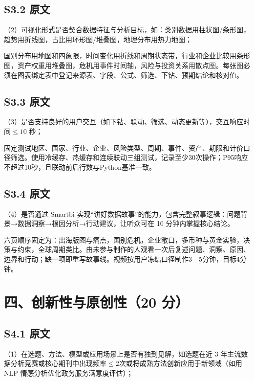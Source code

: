 \subsection*{S3.2 原文}
（2）可视化形式是否契合数据特征与分析目标，如：类别数据用柱状图/条形图，趋势用折线图，占比用环形图/堆叠图，地理分布用热力地图；

\begin{decisionbox}[S3.2 怎么做]
国别分布用地图和四象限，时间变化用折线和周期状态带，行业和企业比较用条形图，资产权重用堆叠图，危机用事件时间轴，风险与投资关系用散点图。每张图必须在图表绑定表中登记来源表、字段、公式、筛选、下钻、预期结论和核对值。
\end{decisionbox}

\subsection*{S3.3 原文}
（3）是否支持良好的用户交互（如下钻、联动、筛选、动态更新等），交互响应时间$\leq 10$ 秒；

\begin{decisionbox}[S3.3 怎么做]
固定测试地区、国家、行业、企业、风险类型、周期、事件、资产、期限和计价口径筛选。使用冷缓存、热缓存和连续联动三组测试，记录至少30次操作；P95响应不超过10秒，且联动前后行数与Python基准一致。
\end{decisionbox}

\subsection*{S3.4 原文}
（4）是否通过 Smartbi 实现“讲好数据故事”的能力，包含完整叙事逻辑：问题背景→数据洞察→根因分析→行动建议，让听众可在 10 分钟内掌握核心结论。

\begin{decisionbox}[S3.4 怎么做]
六页顺序固定为：出海版图与痛点，国别危机，企业敞口，多币种与黄金实验，决策与约束，全球周期类比。由未参与制作的人观看一次后复述问题、洞察、原因、边界和行动；缺一项即重写故事线。视频按用户冻结口径制作3—5分钟，目标4分钟。
\end{decisionbox}

\section{四、创新性与原创性（20 分）}

\subsection*{S4.1 原文}
（1）在选题、方法、模型或应用场景上是否有独到见解，如选题在近 3 年主流数据分析竞赛或核心期刊中出现频率$\leq 2$次或将成熟方法创新应用于新领域（如用 NLP 情感分析优化政务服务满意度评估）；

